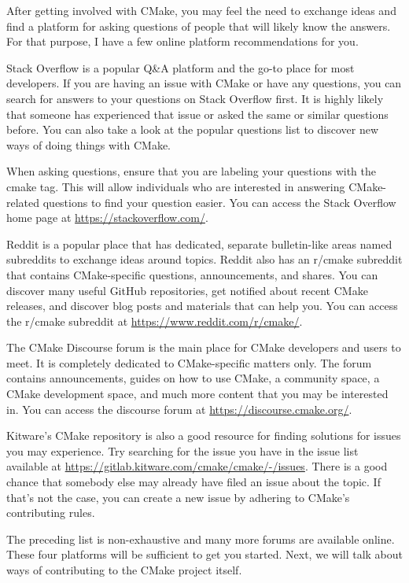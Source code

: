 
After getting involved with CMake, you may feel the need to exchange ideas and find a platform for asking questions of people that will likely know the answers. For that purpose, I have a few online platform recommendations for you.


Stack Overflow is a popular Q\&A platform and the go-to place for most developers. If you are having an issue with CMake or have any questions, you can search for answers to your questions on Stack Overflow first. It is highly likely that someone has experienced that issue or asked the same or similar questions before. You can also take a look at the popular questions list to discover new ways of doing things with CMake.

When asking questions, ensure that you are labeling your questions with the cmake tag. This will allow individuals who are interested in answering CMake-related questions to find your question easier. You can access the Stack Overflow home page at \url{https://stackoverflow.com/}.


Reddit is a popular place that has dedicated, separate bulletin-like areas named subreddits to exchange ideas around topics. Reddit also has an r/cmake subreddit that contains CMake-specific questions, announcements, and shares. You can discover many useful GitHub repositories, get notified about recent CMake releases, and discover blog posts and materials that can help you. You can access the r/cmake subreddit at \url{https://www.reddit.com/r/cmake/}.


The CMake Discourse forum is the main place for CMake developers and users to meet. It is completely dedicated to CMake-specific matters only. The forum contains  announcements, guides on how to use CMake, a community space, a CMake development space, and much more content that you may be interested in. You can access the discourse forum at \url{https://discourse.cmake.org/}.


Kitware's CMake repository is also a good resource for finding solutions for issues you may experience. Try searching for the issue you have in the issue list available at \url{https://gitlab.kitware.com/cmake/cmake/-/issues}. There is a good chance that somebody else may already have filed an issue about the topic. If that's not the case, you can create a new issue by adhering to CMake's contributing rules.

The preceding list is non-exhaustive and many more forums are available online. These four platforms will be sufficient to get you started. Next, we will talk about ways of contributing to the CMake project itself.